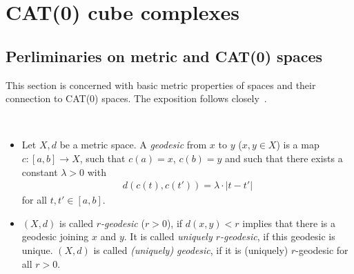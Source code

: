 \section{CAT(0) cube complexes}
\label{sec:complexes}

\subsection{Perliminaries on metric and CAT(0) spaces}
\label{sec:metric}
This section is concerned with basic metric properties of spaces and their connection to CAT(\(0\)) spaces. The exposition follows closely~\cite{MR1744486}.

\begin{defin}~
  \begin{itemize}
  \item Let \(X, d\) be a metric space. A \emph{geodesic} from \(x\) to \(y\) (\(x,y \in X\)) is a map \(c\colon [a,b] \to X\), such that \(c(a) = x\), \(c(b) = y\) and such that there exists a constant \(\lambda > 0\) with
    \begin{align*}
      d(c(t), c(t')) = \lambda \cdot |t - t'| 
    \end{align*}
    for all \(t,t' \in [a,b]\).
  \item \((X,d)\) is called \emph{\(r\)-geodesic} (\(r > 0\)), if \(d(x,y) < r\) implies that there is a geodesic joining \(x\) and \(y\). It is called \emph{uniquely \(r\)-geodesic}, if this geodesic is unique. \((X,d)\) is called \emph{(uniquely) geodesic}, if it is (uniquely) \(r\)-geodesic for all \(r > 0\).
  \end{itemize}
\end{defin}

